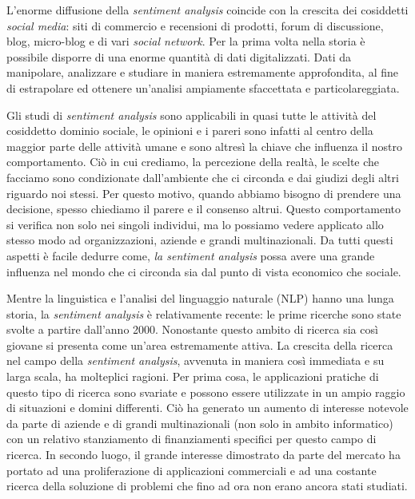 \documentclass[a4paper,12pt,openright,twoside]{report}
\theoremstyle{definition}
\begin{document}
L'enorme diffusione della \emph{sentiment analysis} coincide con la 
crescita dei cosiddetti \emph{social media}: siti di commercio e recensioni di prodotti,
forum di discussione, blog, micro-blog e di vari \emph{social network}.
Per la prima volta nella storia è possibile disporre di una
enorme quantità di dati digitalizzati. Dati da manipolare, analizzare e studiare in maniera
estremamente approfondita, al fine di estrapolare ed ottenere un'analisi
ampiamente sfaccettata e particolareggiata.

Gli studi di \emph{sentiment analysis} sono applicabili in quasi tutte
le attività del cosiddetto dominio sociale, le opinioni e i pareri 
sono infatti al centro della maggior parte delle attività umane e sono 
altresì la chiave che influenza il nostro comportamento.
Ciò in cui crediamo, la percezione della realtà, le scelte che facciamo
sono condizionate dall’ambiente che ci circonda e dai giudizi 
degli altri riguardo noi stessi.
Per questo motivo, quando abbiamo bisogno
di prendere una decisione, spesso chiediamo il parere e il consenso altrui.
Questo comportamento si verifica non solo 
nei singoli individui, ma lo possiamo  vedere applicato allo stesso modo ad organizzazioni, aziende e grandi multinazionali.
Da tutti questi aspetti è facile dedurre 
come, \emph{la sentiment analysis} possa avere una grande influenza nel mondo che 
ci circonda sia dal punto di vista economico che sociale.

Mentre la linguistica e l'analisi del linguaggio naturale (NLP) hanno una lunga
storia, la \emph{sentiment analysis} è relativamente recente: le prime ricerche
sono state svolte a partire dall'anno 2000. Nonostante questo ambito di ricerca sia così giovane 
si presenta come un'area estremamente attiva.
La crescita della ricerca nel campo della \emph{sentiment analysis}, avvenuta in maniera così immediata e su larga scala, 
ha molteplici ragioni. 
Per prima cosa, le applicazioni pratiche 
di questo tipo di ricerca sono svariate e possono essere utilizzate in un ampio raggio di 
situazioni e domini differenti. Ciò ha generato un aumento di interesse notevole da parte di
aziende e di grandi multinazionali (non solo in ambito informatico)
con un relativo stanziamento di finanziamenti specifici per questo campo di ricerca.
In secondo luogo, il grande interesse dimostrato da parte del mercato ha portato ad una proliferazione di 
applicazioni commerciali e ad una costante ricerca della soluzione di problemi
che fino ad ora non erano ancora stati studiati.
\end{document}
